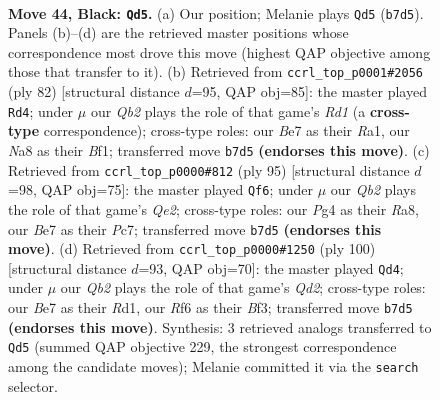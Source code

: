 \documentclass[11pt]{article}
\begin{document}
\begin{figure}[p]\centering
\begin{subfigure}{0.46\textwidth}\centering
\resizebox{\linewidth}{!}{%
\newchessgame
\chessboard[
  setfen={n1r1n1k1/1q2b3/p4r2/P1p2p1p/3p1Pp1/1P4P1/1QRBP2P/R2NN1K1 b - - 5 44},
  showmover=false,
  pgfstyle=straightmove, color=movearrow, markmove={b7-d5}
]}
\caption{}
\end{subfigure}\hfill
\begin{subfigure}{0.46\textwidth}\centering
\resizebox{\linewidth}{!}{%
\newchessgame
\chessboard[
  setfen={b2r2k1/2q3p1/1p1pprn1/6b1/PpP4p/1P3P1P/2Q1N1PB/R2R1B1K w - - 4 42},
  showmover=false,
  pgfstyle=straightmove, color=movearrow, markmove={d1-d4}
]}
\caption{}
\end{subfigure}
\\[4pt]
\begin{subfigure}{0.46\textwidth}\centering
\resizebox{\linewidth}{!}{%
\newchessgame
\chessboard[
  setfen={r3rnk1/2p1qp2/1p1p2p1/3P4/1PP1PBB1/p3Q1P1/Pb4K1/4R2R b - - 17 48},
  showmover=false,
  pgfstyle=straightmove, color=movearrow, markmove={e7-f6}
]}
\caption{}
\end{subfigure}\hfill
\begin{subfigure}{0.46\textwidth}\centering
\resizebox{\linewidth}{!}{%
\newchessgame
\chessboard[
  setfen={1qr1n1k1/rb3pp1/1p1pp2p/8/1PP1PP2/2N2B1P/3Q2P1/2RR3K w - - 47 51},
  showmover=false,
  pgfstyle=straightmove, color=movearrow, markmove={d2-d4}
]}
\caption{}
\end{subfigure}
\caption{\textbf{Move 44, Black: \texttt{Qd5}.} (a) Our position; Melanie plays \texttt{Qd5} (\texttt{b7d5}). Panels (b)--(d) are the retrieved master positions whose correspondence most drove this move (highest QAP objective among those that transfer to it). (b) Retrieved from \texttt{ccrl\_top\_p0001\#2056} (ply 82) [structural distance $d$=95, QAP obj=85]: the master played \texttt{Rd4}; under $\mu$ our \emph{Qb2} plays the role of that game's \emph{Rd1} (a \textbf{cross-type} correspondence); cross-type roles: our \emph{B}e7 as their \emph{R}a1, our \emph{N}a8 as their \emph{B}f1; transferred move \texttt{b7d5} \textbf{(endorses this move)}. (c) Retrieved from \texttt{ccrl\_top\_p0000\#812} (ply 95) [structural distance $d$=98, QAP obj=75]: the master played \texttt{Qf6}; under $\mu$ our \emph{Qb2} plays the role of that game's \emph{Qe2}; cross-type roles: our \emph{P}g4 as their \emph{R}a8, our \emph{B}e7 as their \emph{P}c7; transferred move \texttt{b7d5} \textbf{(endorses this move)}. (d) Retrieved from \texttt{ccrl\_top\_p0000\#1250} (ply 100) [structural distance $d$=93, QAP obj=70]: the master played \texttt{Qd4}; under $\mu$ our \emph{Qb2} plays the role of that game's \emph{Qd2}; cross-type roles: our \emph{B}e7 as their \emph{R}d1, our \emph{R}f6 as their \emph{B}f3; transferred move \texttt{b7d5} \textbf{(endorses this move)}. Synthesis: 3 retrieved analogs transferred to \texttt{Qd5} (summed QAP objective 229, the strongest correspondence among the candidate moves); Melanie committed it via the \texttt{search} selector.}
\label{fig:thought-m87}
\end{figure}
\end{document}
